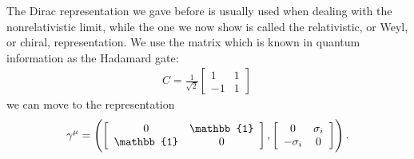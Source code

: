 \documentclass[main.tex]{subfiles}
\begin{document}
The Dirac representation we gave before is usually used when dealing with the nonrelativistic limit, while the one we now show is called the relativistic, or Weyl, or chiral, representation. 
We use the matrix which is known in quantum information as the Hadamard gate:
%
\begin{align}
C = \frac{1}{\sqrt{2}} \left[\begin{array}{cc}
1 & 1 \\ 
-1 & 1
\end{array}\right]
\,
\end{align}
%
we can move to the representation 
%
\begin{align}
\gamma^{\mu } = \qty(\left[\begin{array}{cc}
0 & \mathbb{1} \\ 
\mathbb{1} & 0
\end{array}\right], \left[\begin{array}{cc}
0 & \sigma_{i} \\ 
- \sigma_{i} & 0
\end{array}\right])
\,.
\end{align}
%
\end{document}
